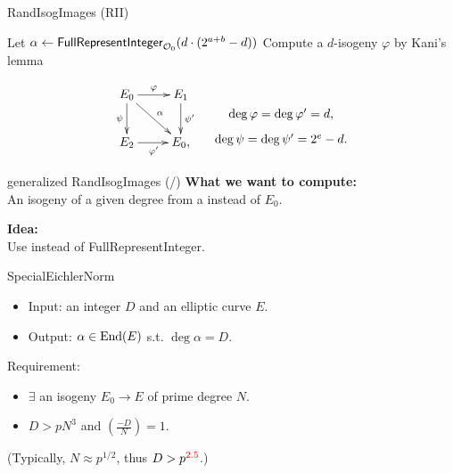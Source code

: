 
\begin{frame}{RandIsogImages (RII)}
    \begin{algorithm}[H]
        \caption{\textsf{RandIsogImages}}
        \BlankLine
        Let $\alpha \leftarrow \textsf{FullRepresentInteger}_{\mathcal{O}_0}(d\cdot(2^{a+b} - d))$\;
        Compute a $d$-isogeny $\varphi$ by Kani's lemma\;
        \Return{$\varphi$}\;
    \end{algorithm}


    \vspace*{5pt}
    \begin{equation*}
        \xymatrix{
            E_0 \ar[r]^\varphi \ar[d]_\psi \ar[dr]^{\alpha} & E_1 \ar[d]^{\psi'} \\
            E_2 \ar[r]_{\varphi'} & E_0,
        }
        \hspace*{10pt}
        \xymatrix@R=5pt{
            \\
            \deg\varphi = \deg\varphi' = d,\\
            \deg\psi = \deg\psi' = 2^e - d.
        }
    \end{equation*}
\end{frame}

\newcommand*{\genRIItotal}{\total{genRIIcnt}}
\begin{frame}{generalized RandIsogImages (/\genRIItotal{})}
    \textbf{What we want to compute:}\\
    \quad An isogeny of a given degree from a  instead of $E_0$.

    \vspace*{10pt}
    \textbf{Idea:}\\
    \quad Use  instead of \textsf{FullRepresentInteger}.

    \vspace*{10pt}
    \begin{itembox}{\textsf{SpecialEichlerNorm}}
    \begin{itemize}
        \item Input: an integer $D$ and an elliptic curve $E$.
        \item Output: $\alpha \in \mathrm{End}(E)$ s.t. $\deg\alpha = D$.
    \end{itemize}
    Requirement:
    \begin{itemize}
        \item $\exists$ an isogeny $E_0 \to E$ of prime degree $N$.
        \item $D > pN^3$ and $\left(\frac{-D}{N}\right) = 1$.
    \end{itemize}
    \quad (Typically, $N \approx p^{1/2}$, thus $D > p^{\textcolor{red}{2.5}}$.)
    \end{itembox}
\end{frame}

